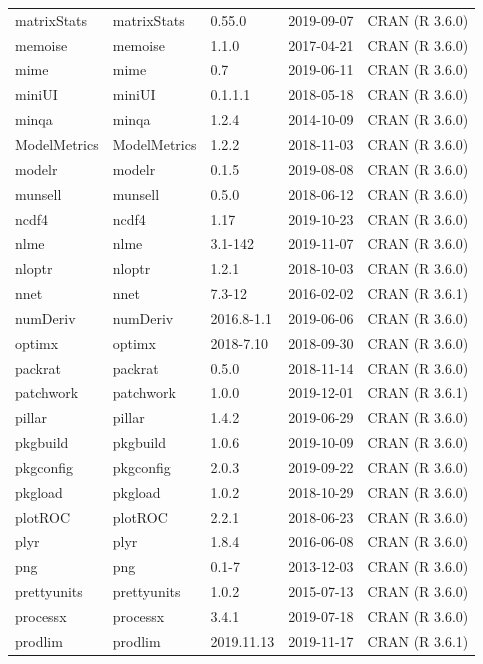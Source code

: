 \documentclass[]{article}
\begin{document}
\begin{longtable}[t]{lllll}
matrixStats & matrixStats & 0.55.0 & 2019-09-07 & CRAN (R 3.6.0)\\
memoise & memoise & 1.1.0 & 2017-04-21 & CRAN (R 3.6.0)\\
\addlinespace
mime & mime & 0.7 & 2019-06-11 & CRAN (R 3.6.0)\\
miniUI & miniUI & 0.1.1.1 & 2018-05-18 & CRAN (R 3.6.0)\\
minqa & minqa & 1.2.4 & 2014-10-09 & CRAN (R 3.6.0)\\
ModelMetrics & ModelMetrics & 1.2.2 & 2018-11-03 & CRAN (R 3.6.0)\\
modelr & modelr & 0.1.5 & 2019-08-08 & CRAN (R 3.6.0)\\
\addlinespace
munsell & munsell & 0.5.0 & 2018-06-12 & CRAN (R 3.6.0)\\
ncdf4 & ncdf4 & 1.17 & 2019-10-23 & CRAN (R 3.6.0)\\
nlme & nlme & 3.1-142 & 2019-11-07 & CRAN (R 3.6.0)\\
nloptr & nloptr & 1.2.1 & 2018-10-03 & CRAN (R 3.6.0)\\
nnet & nnet & 7.3-12 & 2016-02-02 & CRAN (R 3.6.1)\\
\addlinespace
numDeriv & numDeriv & 2016.8-1.1 & 2019-06-06 & CRAN (R 3.6.0)\\
optimx & optimx & 2018-7.10 & 2018-09-30 & CRAN (R 3.6.0)\\
packrat & packrat & 0.5.0 & 2018-11-14 & CRAN (R 3.6.0)\\
patchwork & patchwork & 1.0.0 & 2019-12-01 & CRAN (R 3.6.1)\\
pillar & pillar & 1.4.2 & 2019-06-29 & CRAN (R 3.6.0)\\
\addlinespace
pkgbuild & pkgbuild & 1.0.6 & 2019-10-09 & CRAN (R 3.6.0)\\
pkgconfig & pkgconfig & 2.0.3 & 2019-09-22 & CRAN (R 3.6.0)\\
pkgload & pkgload & 1.0.2 & 2018-10-29 & CRAN (R 3.6.0)\\
plotROC & plotROC & 2.2.1 & 2018-06-23 & CRAN (R 3.6.0)\\
plyr & plyr & 1.8.4 & 2016-06-08 & CRAN (R 3.6.0)\\
\addlinespace
png & png & 0.1-7 & 2013-12-03 & CRAN (R 3.6.0)\\
prettyunits & prettyunits & 1.0.2 & 2015-07-13 & CRAN (R 3.6.0)\\
processx & processx & 3.4.1 & 2019-07-18 & CRAN (R 3.6.0)\\
prodlim & prodlim & 2019.11.13 & 2019-11-17 & CRAN (R 3.6.1)\\

\end{longtable}
\end{document}
